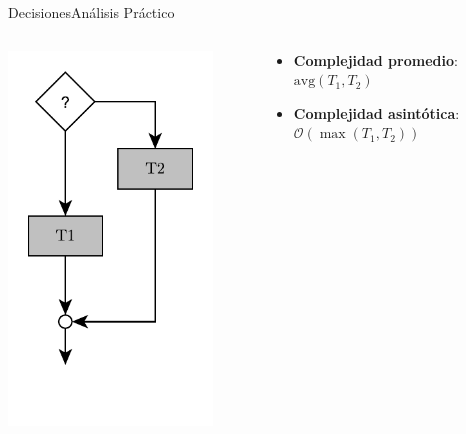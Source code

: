 \documentclass[spanish, c]{beamer}
\newcommand{\bigO}{\mathcal{O}}
\begin{document}
\begin{frame}{Decisiones}{Análisis Práctico}
    
    \begin{columns}
        \begin{column}{0.35\textwidth}
            \begin{center}
                \includegraphics[width=0.85\textwidth]{decision-times.pdf}
            \end{center}
        \end{column}
        \begin{column}{0.65\textwidth}
            \hspace{-1in}
            \begin{itemize}
                \item \textbf{Complejidad promedio}: $\text{avg} (T_1, T_2)$
                \item \textbf{Complejidad asintótica}: $\bigO(\max(T_1, T_2))$
            \end{itemize}


\end{column}
\end{columns}
\end{frame}
\end{document}
